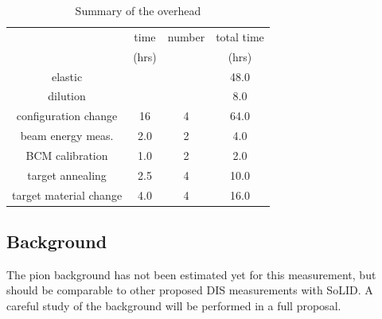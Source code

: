 \begin{table}[h]
\begin{center}
\caption{\label{solidOVHEAD}Summary of the overhead}
\begin{tabular}{c|ccc}\hline\hline
     ~                 &  time   & number &   total time \\
     ~                 &  (hrs)  &   ~    &    (hrs)     \\
\hline
elastic                &    ~    &   ~    &     48.0     \\
dilution               &    ~    &   ~    &     8.0      \\
configuration change   &   16    &   4    &     64.0     \\
beam energy meas.      &   2.0   &   2    &     4.0      \\
BCM calibration        &   1.0   &   2    &     2.0      \\
target annealing       &   2.5   &   4    &     10.0     \\
target material change &   4.0   &   4    &     16.0     \\
\hline\hline
\end{tabular}
\end{center}
\end{table}

\subsection{Background}
The pion background has not been estimated yet for this measurement, but should be comparable to other 
proposed DIS measurements with SoLID. A careful study of the background will be performed in a full 
proposal.

